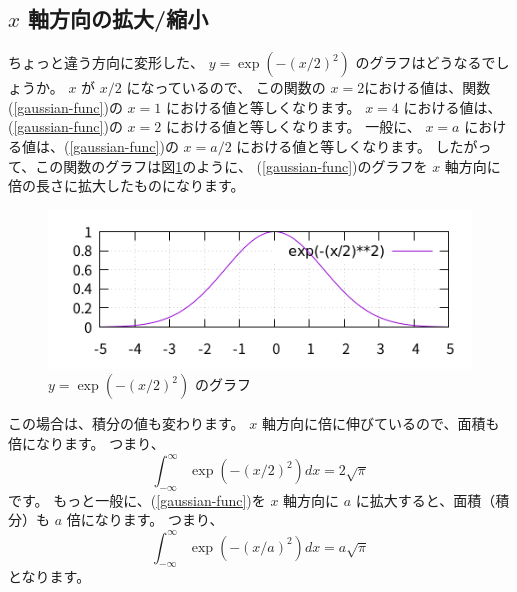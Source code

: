 \documentclass[uplatex,dvipdfmx]{jsarticle}
\begin{document}
\subsection{$x$ 軸方向の拡大/縮小}
  ちょっと違う方向に変形した、 $y = \exp(-(x/2)^2)$ のグラフはどうなるでしょうか。
  $x$ が $x/2$ になっているので、
  この関数の $x = 2$における値は、関数(\ref{gaussian-func})の $x = 1$ における値と等しくなります。
  $x = 4$ における値は、(\ref{gaussian-func})の $x = 2$ における値と等しくなります。
  一般に、 $x = a$ における値は、(\ref{gaussian-func})の $x = a/2$ における値と等しくなります。
  したがって、この関数のグラフは図\ref{gaussian3}のように、
  (\ref{gaussian-func})のグラフを $x$ 軸方向に倍の長さに拡大したものになります。
  \begin{figure}
    \centering
    \includegraphics[width=15cm]{gaussian3.png}
    \caption{$y = \exp(-(x/2)^2)$ のグラフ}
    \label{gaussian3}
  \end{figure}
  この場合は、積分の値も変わります。 $x$ 軸方向に倍に伸びているので、面積も倍になります。
  つまり、
  \[
    \int_{-\infty}^{\infty} \exp(-(x/2)^2) dx = 2\sqrt{\pi}
  \]
  です。
  もっと一般に、(\ref{gaussian-func})を $x$ 軸方向に $a$ に拡大すると、面積（積分）も $a$ 倍になります。
  つまり、
  \[
    \int_{-\infty}^{\infty} \exp(-(x/a)^2) dx = a\sqrt{\pi}
  \]
  となります。
\end{document}

